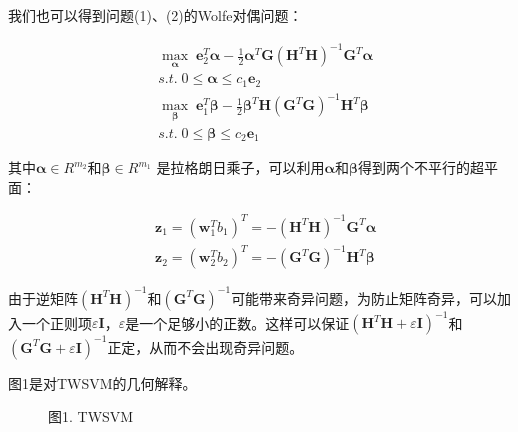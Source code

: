 \documentclass{article}
\theoremstyle{definition}
\theoremstyle{definition}
\theoremstyle{remark}
\begin{document}
我们也可以得到问题(1)、(2)的Wolfe对偶问题：

\begin{align}
&\max\limits_{\pmb{\alpha}} \; \mathbf{e}_2^T \pmb{\alpha}-\frac{1}{2}\pmb{\alpha}^T\mathbf{G}(\mathbf{H}^T\mathbf{H})^{-1}\mathbf{G}^T\pmb{\alpha} \nonumber \\
&s.t. \; 0 \leq \pmb{\alpha}\leq c_1 \mathbf{e}_2 \\
&\max\limits_{\pmb{\beta}} \; \mathbf{e}_1^T \pmb{\beta}-\frac{1}{2}\pmb{\beta}^T\mathbf{H}(\mathbf{G}^T\mathbf{G})^{-1}\mathbf{H}^T\pmb{\beta} \nonumber \\
&s.t. \; 0 \leq \pmb{\beta} \leq c_2\mathbf{e}_1 
\end{align}

其中$\mathbf{\alpha} \in R^{m_2}$和$\mathbf{\beta}\in R^{m_1}$ 是拉格朗日乘子，可以利用$\mathbf{\alpha} $和$\mathbf{\beta}$得到两个不平行的超平面：

\begin{align}
& \mathbf{z}_1 = (\mathbf{w}^T_1b_1)^T = -(\mathbf{H}^T\mathbf{H})^{-1} \mathbf{G}^
T\pmb{\alpha}\nonumber \\
&\mathbf{z}_2 = (\mathbf{w}^T_2b_2)^T = -(\mathbf{G}^T\mathbf{G})^{-1} \mathbf{H}^T\pmb{\beta}
\end{align}

由于逆矩阵$(\mathbf{H}^T\mathbf{H})^{-1}$和$(\mathbf{G}^T\mathbf{G})^{-1}$可能带来奇异问题，为防止矩阵奇异，可以加入一个正则项$\varepsilon \mathbf{I}$，$\varepsilon$是一个足够小的正数。这样可以保证$(\mathbf{H}^T\mathbf{H}+\varepsilon \mathbf{I})^{-1}$和$(\mathbf{G}^T\mathbf{G}+\varepsilon \mathbf{I})^{-1}$正定，从而不会出现奇异问题。

图1是对TWSVM的几何解释。
\begin{figure}[H]
	\centering 
\caption*{图1. TWSVM}
\end{figure}
\end{document}
